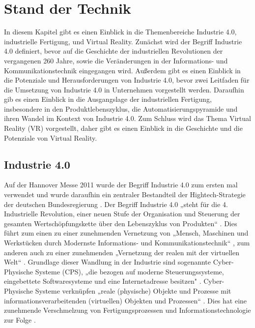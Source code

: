 \chapter{Stand der Technik}\label{cha:StandDerTechnik}

In diesem Kapitel gibt es einen Einblick in die Themenbereiche Industrie 4.0, industrielle Fertigung, und Virtual Reality.
Zunächst wird der Begriff Industrie 4.0 definiert, bevor auf die Geschichte der industriellen Revolutionen der vergangenen 260 Jahre, sowie die Veränderungen in der Informations- und Kommunikationstechnik eingegangen wird. Außerdem gibt es einen Einblick in die Potenziale und Herausforderungen von Industrie 4.0, bevor zwei Leitfaden für die Umsetzung von Industrie 4.0 in Unternehmen vorgestellt werden.
Daraufhin gib es einen Einblick in die Ausgangslage der industriellen Fertigung, insbesondere in den Produktlebenszyklus, die Automatisierungspyramide und ihren Wandel im Kontext von Industrie 4.0.
Zum Schluss wird das Thema Virtual Reality (VR) vorgestellt, daher gibt es einen Einblick in die Geschichte und die Potenziale von Virtual Reality.

\section{Industrie 4.0}\label{sec:Industrie4.0}
Auf der Hannover Messe 2011 wurde der Begriff Industrie 4.0 zum ersten mal verwendet und wurde daraufhin ein zentraler Bestandteil der Hightech-Strategie der deutschen Bundesregierung \cite{8}.
Der Begriff Industrie 4.0 „steht für die 4. Industrielle Revolution, einer neuen Stufe der Organisation und Steuerung der gesamten Wertschöpfungskette über den Lebenszyklus von Produkten“ \cite{1}. Dies führt zum einen zu einer zunehmenden Vernetzung von „Mensch, Maschinen und Werkstücken durch Modernste Informations- und Kommunikationstechnik“ \cite{6}, zum anderen auch zu einer zunehmenden „Vernetzung der realen mit der virtuellen Welt“ \cite{7}.
\newline
Grundlage dieser Wandlung in der Industrie sind sogenannte Cyber-Physische Systeme (CPS), „die bezogen auf moderne Steuerungssysteme, eingebettete Softwaresysteme und eine Internetadresse besitzen" \cite{1}. Cyber-Physische Systeme verknüpfen „reale (physische) Objekte und Prozesse mit informationsverarbeitenden (virtuellen) Objekten und Prozessen“ \cite{11}. Dies hat eine zunehmende Verschmelzung von Fertigungsprozessen und Informationstechnologie zur Folge \cite{7}.


